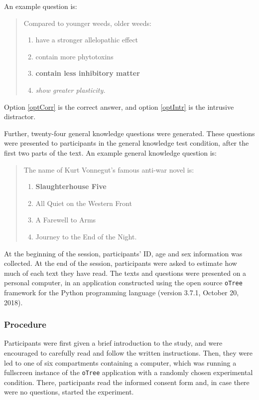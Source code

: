 \documentclass[11pt,]{article}
\begin{document}
An example question is:

\begin{quotation}
\noindent Compared to younger weeds, older weeds:
\begin{enumerate}[label = (\alph*)]
\item have a stronger allelopathic effect
\item contain more phytotoxins
\item \label{optCorr} \textbf{contain less inhibitory matter}
\item \label{optIntr} \textit{show greater plasticity.}
\end{enumerate}
\end{quotation}

Option \ref{optCorr} is the correct answer, and option \ref{optIntr} is
the intrusive distractor.

Further, twenty-four general knowledge questions were generated. These
questions were presented to participants in the general knowledge test
condition, after the first two parts of the text. An example general
knowledge question is:

\begin{quotation}
\noindent The name of Kurt Vonnegut's famous anti-war novel is:
\begin{enumerate}[label = (\alph*)]
\item \textbf{Slaughterhouse Five}
\item All Quiet on the Western Front
\item A Farewell to Arms
\item Journey to the End of the Night.
\end{enumerate}
\end{quotation}

At the beginning of the session, participants' ID, age and sex
information was collected. At the end of the session, participants were
asked to estimate how much of each text they have read. The texts and
questions were presented on a personal computer, in an application
constructed using the open source \texttt{oTree} framework
\citep[version 2.0,][]{chen_otreeopen-source_2016} for the Python
programming language (version 3.7.1, October 20, 2018).

\hypertarget{procedure}{%
\subsubsection{Procedure}\label{procedure}}

Participants were first given a brief introduction to the study, and
were encouraged to carefully read and follow the written instructions.
Then, they were led to one of six compartments containing a computer,
which was running a fullscreen instance of the \texttt{oTree}
application with a randomly chosen experimental condition. There,
participants read the informed consent form and, in case there were no
questions, started the experiment.
\end{document}

